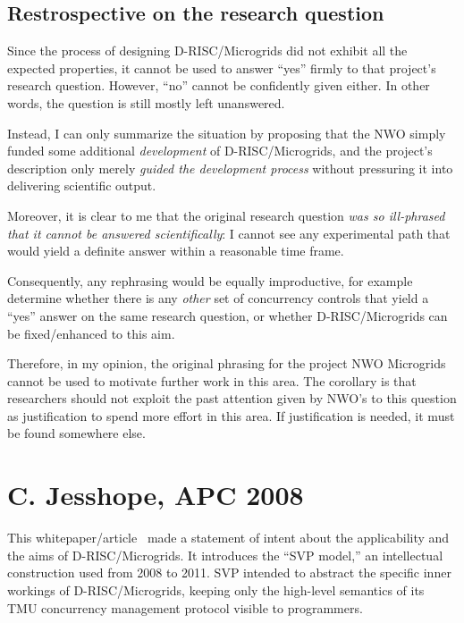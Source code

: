 \subsection{Restrospective on the research question}

Since the process of designing D-RISC/Microgrids did not exhibit all
the expected properties, it cannot be used to answer ``yes'' firmly to
that project's research question. However, ``no'' cannot be
confidently given either. In other words, the question is still mostly
left unanswered.

Instead, I can only summarize the situation by proposing that the NWO
simply funded some additional \emph{development} of D-RISC/Microgrids,
and the project's description only merely \emph{guided the development
  process} without pressuring it into delivering scientific output.

Moreover, it is clear to me that the original research question
\emph{was so ill-phrased that it cannot be answered scientifically}: I
cannot see any experimental path that would yield a definite answer
within a reasonable time frame. 

Consequently, any rephrasing would be equally improductive, for example
determine whether there is any \emph{other} set of concurrency
controls that yield a ``yes'' answer on the same research question, or
whether D-RISC/Microgrids can be fixed/enhanced to this aim. 

Therefore, in my opinion, the original phrasing for the project NWO
Microgrids cannot be used to motivate further work in this area.  The
corollary is that researchers should not exploit the past attention
given by NWO's to this question as justification to spend more effort
in this area. If justification is needed, it must be found somewhere
else.

\section{C. Jesshope, APC 2008}

This whitepaper/article~\cite{jesshope.08.apc} made a statement of
intent about the applicability and the aims of D-RISC/Microgrids. It
introduces the ``SVP model,'' an intellectual construction used from
2008 to 2011. SVP intended to abstract the specific inner workings of
D-RISC/Microgrids, keeping only the high-level semantics of its TMU
concurrency management protocol visible to programmers.


